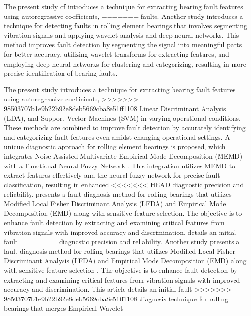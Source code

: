 \documentclass[sn-basic,pdflatex]{sn-jnl}
\theoremstyle{remark}
\theoremstyle{definition}
\begin{document}
The present study of \citet{WOS:000440977000032} introduces a technique
for extracting bearing fault features using autoregressive coefficients,
=======
faults. Another study \citep[@WOS:000449334500118]{WOS:000450745100001}
introduces a technique for detecting faults in rolling element bearings
that involves segmenting vibration signals and applying wavelet analysis
and deep neural networks. This method improves fault detection by
segmenting the signal into meaningful parts for better accuracy,
utilizing wavelet transforms for extracting features, and employing deep
neural networks for clustering and categorizing, resulting in more
precise identification of bearing faults.

The present study \citep{WOS:000440977000032} introduces a technique for
extracting bearing fault features using autoregressive coefficients,
>>>>>>> 98503707b1e9b22b92e8deb5669cba8e51ff1108
Linear Discriminant Analysis (LDA), and Support Vector Machines (SVM) in
varying operational conditions. These methods are combined to improve
fault detection by accurately identifying and categorizing fault
features even amidst changing operational settings. A unique diagnostic
approach for rolling element bearings is proposed, which integrates
Noise-Assisted Multivariate Empirical Mode Decomposition (MEMD) with a
Functional Neural Fuzzy Network \citep{WOS:000434717400001}. This
integration utilizes MEMD to extract features effectively and the neural
fuzzy network for precise fault classification, resulting in enhanced
<<<<<<< HEAD
diagnostic precision and reliability. \citet{WOS:000426284100001}
presents a fault diagnosis method for rolling bearings that utilizes
Modified Local Fisher Discriminant Analysis (LFDA) and Empirical Mode
Decomposition (EMD) along with sensitive feature selection. The
objective is to enhance fault detection by extracting and examining
critical features from vibration signals with improved accuracy and
discrimination. \citet{WOS:000539546400083} details an initial fault
=======
diagnostic precision and reliability. Another study
\citep{WOS:000426284100001} presents a fault diagnosis method for
rolling bearings that utilizes Modified Local Fisher Discriminant
Analysis (LFDA) and Empirical Mode Decomposition (EMD) along with
sensitive feature selection . The objective is to enhance fault
detection by extracting and examining critical features from vibration
signals with improved accuracy and discrimination.
\citep{WOS:000539546400083} This article details an initial fault
>>>>>>> 98503707b1e9b22b92e8deb5669cba8e51ff1108
diagnosis technique for rolling bearings that merges Empirical Wavelet
\end{document}
